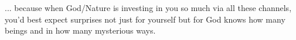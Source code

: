 ... because when God/Nature is investing in you so much via all these channels, you'd best expect surprises not just for yourself but for God knows how many beings and in how many mysterious ways.